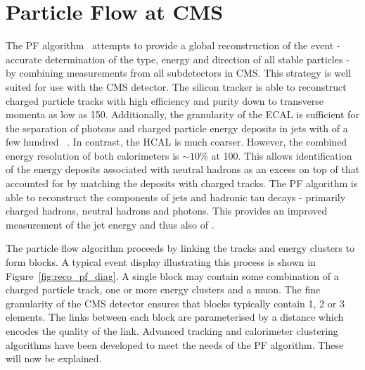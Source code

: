 \section{Particle Flow at \ac{CMS}}
\label{sec:reco_pf}
The \ac{PF} algorithm~\cite{cms_pf_pas, cms_pf_pas2} attempts to provide a
global reconstruction of the event - accurate determination of the type, energy
and direction of all stable particles - by combining measurements from all
subdetectors in \ac{CMS}. This strategy is well suited for use with the \ac{CMS}
detector. The silicon tracker is able to reconstruct charged particle tracks
with high efficiency and purity down to transverse momenta as low as
\unit{150}{\MeV}. Additionally, the granularity of the \ac{ECAL} is sufficient
for the separation of photons and charged particle energy deposits in jets with
\Pt of a few hundred \GeV~\cite{cms_pf_pas}. In contrast, the \ac{HCAL} is much
coarser. However, the combined energy resolution of both calorimeters is $\sim
10\%$ at \unit{100}{\GeV}. This allows identification of the energy deposits
associated with neutral hadrons as an excess on top of that accounted for by
matching the deposits with charged tracks. The \ac{PF} algorithm is able to
reconstruct the components of jets and hadronic tau decays - primarily charged
hadrons, neutral hadrons and photons. This provides an improved measurement of
the jet energy and thus also of \METv.

The particle flow algorithm proceeds by linking the tracks and energy clusters
to form blocks. A typical event display illustrating this process is shown in
Figure~\ref{fig:reco_pf_diag}. A single block may contain some combination of a
charged particle track, one or more energy clusters and a muon. The fine
granularity of the \ac{CMS} detector ensures that blocks typically contain 1, 2
or 3 elements.  The links between each block are parameterised by a distance
which encodes the quality of the link. Advanced tracking and calorimeter
clustering algorithms have been developed to meet the needs of the \ac{PF}
algorithm. These will now be explained.

